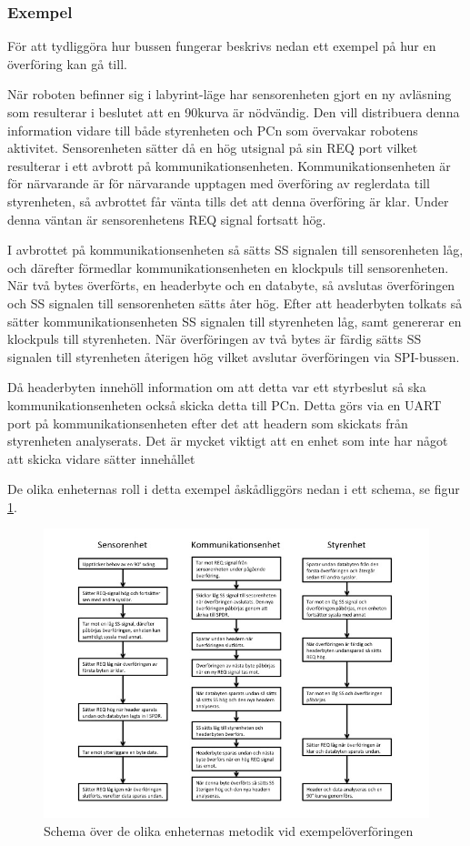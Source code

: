 \subsubsection{Exempel}

För att tydliggöra hur bussen fungerar beskrivs nedan ett exempel på hur en 
överföring kan gå till.

När roboten befinner sig i labyrint-läge har sensorenheten gjort en ny 
avläsning som resulterar i beslutet att en 90\degree kurva är nödvändig. Den 
vill distribuera denna information vidare till både styrenheten och PCn som 
övervakar robotens aktivitet. Sensorenheten sätter då en hög utsignal på sin 
REQ port vilket resulterar i ett avbrott på kommunikationsenheten. 
Kommunikationsenheten är för närvarande är för närvarande upptagen med 
överföring av reglerdata till styrenheten, så avbrottet får vänta tills det 
att denna överföring är klar. Under denna väntan är sensorenhetens REQ signal 
fortsatt hög.

I avbrottet på kommunikationsenheten så sätts SS signalen till sensorenheten 
låg, och därefter förmedlar kommunikationsenheten en klockpuls till 
sensorenheten. När två bytes överförts, en headerbyte och en databyte, så 
avslutas överföringen och SS signalen till sensorenheten sätts åter hög. 
Efter att headerbyten tolkats så sätter kommunikationsenheten SS signalen 
till styrenheten låg, samt genererar en klockpuls till styrenheten. När 
överföringen av två bytes är färdig sätts SS signalen till styrenheten 
återigen hög vilket avslutar överföringen via SPI-bussen. 

Då headerbyten innehöll information om att detta var ett styrbeslut så ska 
kommunikationsenheten också skicka detta till PCn. Detta görs via en UART 
port på kommunikationsenheten efter det att headern som skickats från 
styrenheten analyserats. Det är mycket viktigt att en enhet som inte har 
något att skicka vidare sätter innehållet 

De olika enheternas roll i detta exempel åskådliggörs nedan i ett schema, se 
figur \ref{fig:schema}.


\begin{figure}[H]
 \centering
\includegraphics[angle=0,scale=0.7]{bilder/schema_exempel.jpg}
  \caption{Schema över de olika enheternas metodik vid exempelöverföringen}
  \label{fig:schema}
\end{figure}




